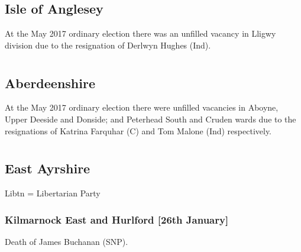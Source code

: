 \documentclass[a4paper,openany]{book}
\begin{document}
\begin{resultsiii}
\subsection*{Isle of Anglesey}

At the May 2017 ordinary election there was an unfilled vacancy in Lligwy division due to the resignation of Derlwyn Hughes (Ind).

\section[Aberdeen City and Shire]{}

\subsection*{Aberdeenshire}

At the May 2017 ordinary election there were unfilled vacancies in Aboyne, Upper Deeside and Donside; and Peterhead South and Cruden wards due to the resignations of Katrina Farquhar (C) and Tom Malone (Ind) respectively.

\section[Ayrshire Councils]{}

\subsection*{East Ayrshire}

Libtn = Libertarian Party

\subsubsection*{Kilmarnock East and Hurlford \hspace*{\fill}\nolinebreak[1]%
\enspace\hspace*{\fill}
[26th January]}


Death of James Buchanan (SNP).


\end{resultsiii}
\end{document}
